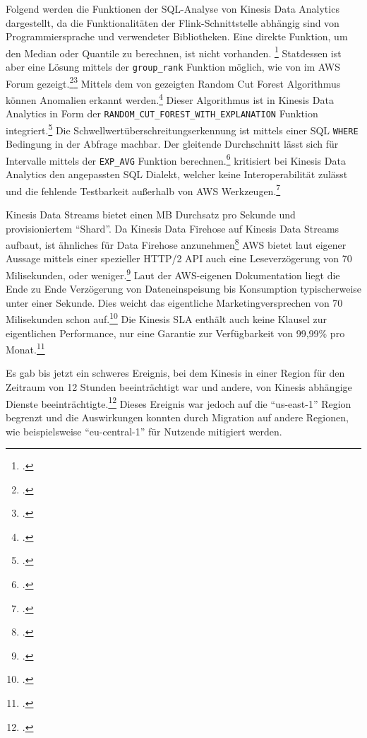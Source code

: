 Folgend werden die Funktionen der \ac{SQL}-Analyse von Kinesis Data Analytics dargestellt, da die Funktionalitäten der Flink-Schnittstelle abhängig sind von Programmiersprache und verwendeter Bibliotheken. 
Eine direkte Funktion, um den Median oder Quantile zu berechnen, ist nicht vorhanden. \footcite[Vgl.][]{RyanN.2018} Statdessen ist aber eine Lösung mittels der \texttt{group_rank} Funktion möglich, wie von \citeauthor{RyanN.2018} im \ac{AWS} Forum gezeigt.\footcite[Vgl.][]{AmazonWebServicesInc..o.J.as}\nzitat\footcite[Vgl.][]{RyanN.2018}
Mittels dem von \citeauthor{Guha.2016} gezeigten Random Cut Forest Algorithmus können Anomalien erkannt werden.\footcite[Vgl.][1]{Guha.2016} Dieser Algorithmus ist in Kinesis Data Analytics in Form der \texttt{RANDOM_CUT_FOREST_WITH_EXPLANATION} Funktion integriert.\footcite[Vgl.][]{AmazonWebServicesInc..o.J.ar}
Die Schwellwertüberschreitungserkennung ist mittels einer \ac{SQL} \texttt{WHERE} Bedingung in der Abfrage machbar.
Der gleitende Durchschnitt lässt sich für Intervalle mittels der \texttt{EXP_AVG} Funktion berechnen.\footcite[Vgl.][]{AmazonWebServicesInc..o.J.aq}
\citeauthor{Herman.2020} kritisiert bei Kinesis Data Analytics den angepassten \ac{SQL} Dialekt, welcher keine Interoperabilität zulässt und die fehlende Testbarkeit außerhalb von \ac{AWS} Werkzeugen.\footcite[Vgl.][]{Herman.2020}

Kinesis Data Streams bietet einen MB Durchsatz pro Sekunde und provisioniertem \enquote{Shard}. Da Kinesis Data Firehose auf Kinesis Data Streams aufbaut, ist ähnliches für Data Firehose anzunehmen\footcite[Vgl.][]{Pogosova.28.05.2020} 
\ac{AWS} bietet laut eigener Aussage mittels einer spezieller HTTP/2 \ac{API} auch eine Leseverzögerung von 70 Milisekunden, oder weniger.\footcite[Vgl.][]{AmazonWebServicesInc..o.J.af} 
Laut der \ac{AWS}-eigenen Dokumentation liegt die Ende zu Ende Verzögerung von Dateneinspeisung bis Konsumption typischerweise unter einer Sekunde. Dies weicht das eigentliche Marketingversprechen von 70 Milisekunden schon auf.\footcite[Vgl.][]{AmazonWebServicesInc..o.J.ae}
Die Kinesis \ac{SLA} enthält auch keine Klausel zur eigentlichen Performance, nur eine Garantie zur Verfügbarkeit von 99,99\% pro Monat.\footcite[Vgl.][]{AmazonWebServicesInc..o.J.ad} 

Es gab bis jetzt ein schweres Ereignis, bei dem Kinesis in einer Region für den Zeitraum von 12 Stunden beeinträchtigt war und andere, von Kinesis abhängige Dienste beeinträchtigte.\footcite[Vgl. auch im Folgenden][]{AmazonWebServicesInc..2020e} Dieses Ereignis war jedoch auf die \enquote{us-east-1} Region begrenzt und die Auswirkungen konnten durch Migration auf andere Regionen, wie beispielsweise \enquote{eu-central-1} für Nutzende mitigiert werden.


